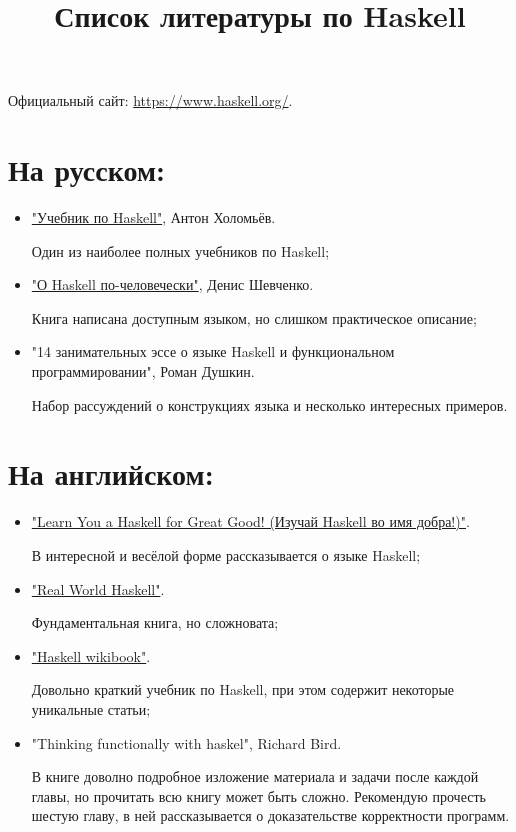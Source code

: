 \documentclass[a4paper,10pt]{article}
\begin{document}
\setcounter{secnumdepth}{0}
\title{Список литературы по Haskell}
\date{}
\maketitle
Официальный сайт: \url{https://www.haskell.org/}.
\section{На русском:}
\begin{itemize}
\item {
\href{https://anton-k.github.io/ru-haskell-book/book/home.html}{"Учебник по Haskell"}, Антон Холомьёв.

Один из наиболее полных учебников по Haskell;
}

\item {
\href{https://www.ohaskell.guide/}{"О Haskell по-человечески"}, Денис Шевченко.

Книга написана доступным языком, но слишком практическое описание;
}

\item {
"14 занимательных эссе о языке Haskell и функциональном программировании"{}, Роман Душкин.

Набор рассуждений о конструкциях языка и несколько интересных примеров.
}
\end{itemize}


\section{На английском:}
\begin{itemize}
\item {
\href{http://learnyouahaskell.com/chapters}{"Learn You a Haskell for Great Good! (Изучай Haskell во имя добра!)"}.

В интересной и весёлой форме рассказывается о языке Haskell;
}

\item {
\href{http://book.realworldhaskell.org/read/}{"Real World Haskell"}.

Фундаментальная книга, но сложновата;
}

\item {
\href{https://en.wikibooks.org/wiki/Haskell}{"Haskell wikibook"}.

Довольно краткий учебник по Haskell, при этом содержит некоторые уникальные статьи;
}

\item {
"Thinking functionally with haskel"{}, Richard Bird.

В книге доволно подробное изложение материала и задачи после каждой главы, но прочитать всю книгу
может быть сложно. Рекомендую прочесть шестую главу, в ней рассказывается о доказательстве
корректности программ. 
}
\end{itemize}
\end{document}
